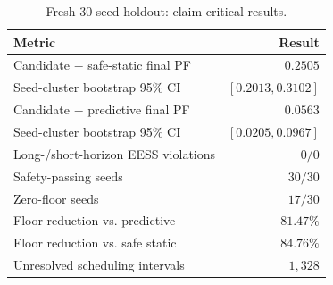 \begin{table}[t]
\caption{Fresh 30-seed holdout: claim-critical results.}
\label{tab:holdout-key-v2}
\centering
\footnotesize
\setlength{\tabcolsep}{3.0pt}
\renewcommand{\arraystretch}{1.06}
\begin{tabular}{@{}lr@{}}
\toprule
Metric & Result\\
\midrule
Candidate $-$ safe-static final PF & $0.2505$\\
Seed-cluster bootstrap 95\% CI & $[0.2013,0.3102]$\\
Candidate $-$ predictive final PF & $0.0563$\\
Seed-cluster bootstrap 95\% CI & $[0.0205,0.0967]$\\
Long-/short-horizon EESS violations & $0/0$\\
Safety-passing seeds & $30/30$\\
Zero-floor seeds & $17/30$\\
Floor reduction vs. predictive & $81.47\%$\\
Floor reduction vs. safe static & $84.76\%$\\
Unresolved scheduling intervals & $1{,}328$\\
\bottomrule
\end{tabular}
\end{table}
